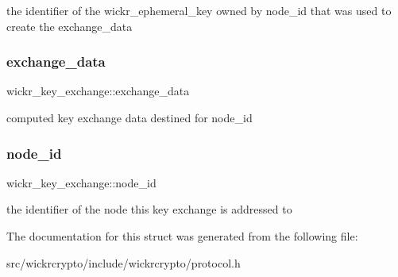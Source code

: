the identifier of the \textquotesingle{}wickr\+\_\+ephemeral\+\_\+key\textquotesingle{} owned by \textquotesingle{}node\+\_\+id\textquotesingle{} that was used to create the \textquotesingle{}exchange\+\_\+data\textquotesingle{} \mbox{\label{structwickr__key__exchange_a6be89562df814a32b19cd57c49037691}} 
\subsubsection{\texorpdfstring{exchange\+\_\+data}{exchange\_data}}
{\footnotesize\ttfamily wickr\+\_\+key\+\_\+exchange\+::exchange\+\_\+data}

computed key exchange data destined for \textquotesingle{}node\+\_\+id\textquotesingle{} \mbox{\label{structwickr__key__exchange_ad5b271c9c3cf2043ec85dbb40c51fec6}} 
\subsubsection{\texorpdfstring{node\+\_\+id}{node\_id}}
{\footnotesize\ttfamily wickr\+\_\+key\+\_\+exchange\+::node\+\_\+id}

the identifier of the node this key exchange is addressed to 

The documentation for this struct was generated from the following file\+:\begin{DoxyCompactItemize}
\item 
src/wickrcrypto/include/wickrcrypto/protocol.\+h\end{DoxyCompactItemize}
